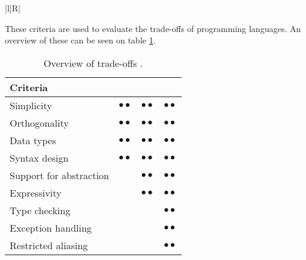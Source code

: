 \begin{table}[H]
\begin{tabularx}{\textwidth}{|l|R|}
	\end{tabularx}
	\caption{Brief explanation of language characteristics \citep{sebesta}.}
	\label{tab:langCharacteristics}
\end{table}
These criteria are used to evaluate the trade-offs of programming languages. An overview of these can be seen on table \ref{tab:langTradeOffs}.

\begin{table}[H]
	\begin{tabular}{l|c|c|c|}
\textbf{Criteria}	& \rotatebox{90}{Readability} &\rotatebox{90}{Writeability} & \rotatebox{90}{Reliability} \\ \hline
Simplicity 				& $\bullet{•}$	& $\bullet{•}$	& $\bullet{•}$ \\ \hline
Orthogonality			& $\bullet{•}$	& $\bullet{•}$	& $\bullet{•}$ \\ \hline
Data types 				& $\bullet{•}$	& $\bullet{•}$	& $\bullet{•}$ \\ \hline
Syntax design 			& $\bullet{•}$	& $\bullet{•}$	& $\bullet{•}$ \\ \hline
Support for abstraction	& ~ 			& $\bullet{•}$ 	& $\bullet{•}$ \\ \hline
Expressivity 			& ~ 			& $\bullet{•}$ 	& $\bullet{•}$ \\ \hline
Type checking 			& ~ 			& ~ 			& $\bullet{•}$ \\ \hline
Exception handling 		& ~ 			& ~ 			& $\bullet{•}$ \\ \hline
Restricted aliasing 	& ~ 			& ~ 			& $\bullet{•}$ \\ \hline
	\end{tabular}
	\caption{Overview of trade-offs \citep{sebesta}.}
	\label{tab:langTradeOffs}
\end{table}

